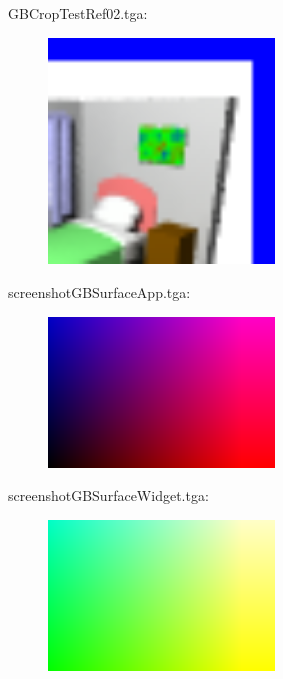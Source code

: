 GBCropTestRef02.tga:\\
\begin{center}
\begin{figure}[H]
\centering\includegraphics[width=6cm]{./GBCropTestRef02.png}\\
\end{figure}
\end{center}

screenshotGBSurfaceApp.tga:\\
\begin{center}
\begin{figure}[H]
\centering\includegraphics[width=6cm]{./screenshotGBSurfaceApp.png}\\
\end{figure}
\end{center}

screenshotGBSurfaceWidget.tga:\\
\begin{center}
\begin{figure}[H]
\centering\includegraphics[width=6cm]{./screenshotGBSurfaceWidget.png}\\
\end{figure}
\end{center}

